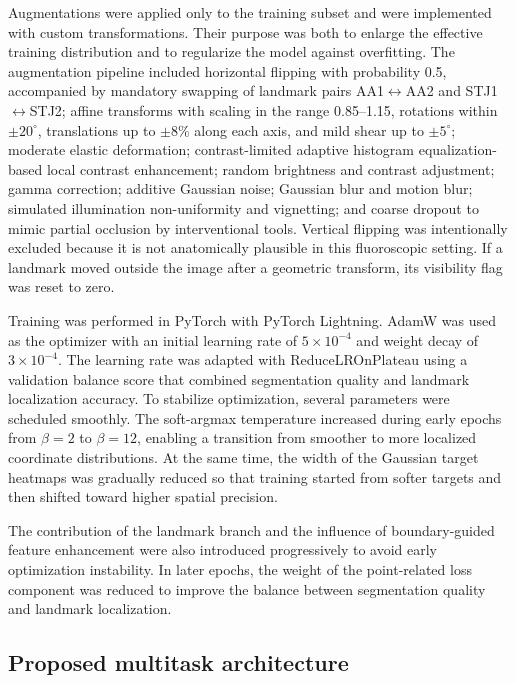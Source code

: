 \documentclass[preprint,12pt,authoryear]{elsarticle}
\begin{document}
Augmentations were applied only to the training subset and were implemented with custom transformations. Their purpose was both to enlarge the effective training distribution and to regularize the model against overfitting. The augmentation pipeline included horizontal flipping with probability 0.5, accompanied by mandatory swapping of landmark pairs AA1$\leftrightarrow$AA2 and STJ1$\leftrightarrow$STJ2; affine transforms with scaling in the range 0.85--1.15, rotations within $\pm 20^{\circ}$, translations up to $\pm 8$\% along each axis, and mild shear up to $\pm 5^{\circ}$; moderate elastic deformation; contrast-limited adaptive histogram equalization-based local contrast enhancement; random brightness and contrast adjustment; gamma correction; additive Gaussian noise; Gaussian blur and motion blur; simulated illumination non-uniformity and vignetting; and coarse dropout to mimic partial occlusion by interventional tools. Vertical flipping was intentionally excluded because it is not anatomically plausible in this fluoroscopic setting. If a landmark moved outside the image after a geometric transform, its visibility flag was reset to zero.

Training was performed in PyTorch with PyTorch Lightning. AdamW was used as the optimizer with an initial learning rate of $5 \times 10^{-4}$ and weight decay of $3 \times 10^{-4}$. The learning rate was adapted with ReduceLROnPlateau using a validation balance score that combined segmentation quality and landmark localization accuracy. To stabilize optimization, several parameters were scheduled smoothly. The soft-argmax temperature increased during early epochs from $\beta=2$ to $\beta=12$, enabling a transition from smoother to more localized coordinate distributions. At the same time, the width of the Gaussian target heatmaps was gradually reduced so that training started from softer targets and then shifted toward higher spatial precision.

The contribution of the landmark branch and the influence of boundary-guided feature enhancement were also introduced progressively to avoid early optimization instability. In later epochs, the weight of the point-related loss component was reduced to improve the balance between segmentation quality and landmark localization.

\subsection{Proposed multitask architecture}
\end{document}
